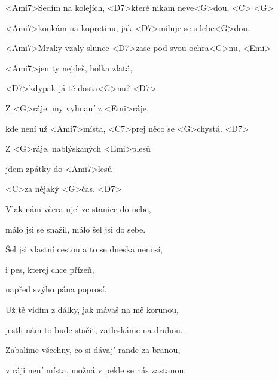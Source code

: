 

\zs
<Ami7>Sedím na kolejích, <D7>které nikam neve<G>dou, <C> <G>

<Ami7>koukám na kopretinu, jak <D7>miluje se s lebe<G>dou.

<Ami7>Mraky vzaly slunce <D7>zase pod svou ochra<G>nu, <Emi>

<Ami7>jen ty nejdeš, holka zlatá,

<D7>kdypak já tě dosta<G>nu? <D7>
\ks

\zr
Z <G>ráje, my vyhnaní z <Emi>ráje,

kde není už <Ami7>místa, <C7>prej něco se <G>chystá. <D7>

Z <G>ráje, nablýskaných <Emi>plesů

jdem zpátky do <Ami7>lesů

<C>za nějaký <G>čas. <D7>
\kr

\zs
Vlak nám včera ujel ze stanice do nebe,

málo jsi se snažil, málo šel jsi do sebe.

Šel jsi vlastní cestou a to se dneska nenosí,

i pes, kterej chce přízeň,

napřed svýho pána poprosí.
\ks

\zr\kr

\zs
Už tě vidím z dálky, jak mávaš na mě korunou,

jestli nám to bude stačit, zatleskáme na druhou.

Zabalíme všechny, co si dávaj' rande za branou,

v ráji není místa, možná v pekle se nás zastanou.
\ks

\zr\kr

\kp
